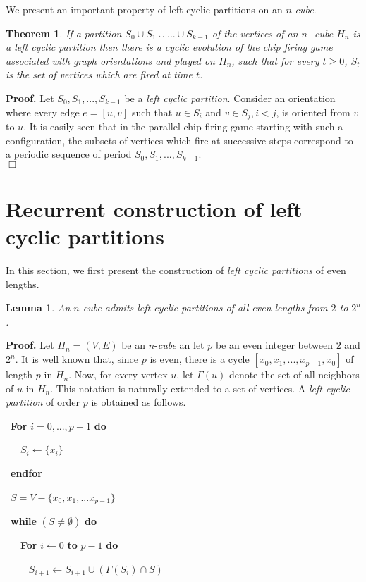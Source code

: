 \documentclass{article}
\newtheorem{theorem}{Theorem}
\newtheorem{lemma}{Lemma}
\begin{document}
We present an important property of left cyclic partitions on an $n$-{\em cube}.

\begin{theorem}
If a partition $S_0\cup S_1\cup ...\cup S_{k-1}$ of the vertices of an $n$-
  cube $H_n$ is a left cyclic partition then there is a
  cyclic evolution of the chip firing game associated with graph orientations
  and played on $H_n$, such that for every $t\geq 0$, $S_t$ is the set of
  vertices which are fired at time $t$.
\end{theorem}
{\bf Proof.} Let $S_0,S_1,...,S_{k-1}$ be a {\em left cyclic partition}. Consider
an orientation where every edge $e=[u,v]$ such that $u\in S_i$ and $v\in
S_j,i<j$, is oriented from $v$ to $u$. It is easily seen that in the parallel chip
firing game starting with such a configuration, the subsets of vertices
which fire at successive steps correspond to a periodic sequence of period
$S_0,S_1,...,S_{k-1}$.\\
$\Box$

\section{Recurrent construction of left cyclic partitions}
In this section, we first present the construction of {\em left cyclic
  partitions} of even lengths.
\begin{lemma}   \label{lem:allpair}
An $n$-cube admits left cyclic partitions of all even lengths from
$2$ to $2^n$.
\end{lemma}
{\bf Proof.} Let $H_n=(V,E)$ be an $n$-{\em cube} an let $p$ be an even
integer between $2$ and $2^n$. It is well known that, since $p$ is even,
there is a cycle $[x_0,x_1, ...,x_{p-1}, x_0]$
of length $p$ in $H_n$. Now, for every vertex $u$, let $\Gamma (u)$ denote the
set of all neighbors of $u$ in $H_n$. This notation is naturally extended to a
set of vertices. A {\em left cyclic partition} of order $p$ is
obtained  as follows.

\ {\bf For}  $i=0,...,p-1$ {\bf do}

\ \ \ $S_i\leftarrow \{ x_i\}$

\ {\bf endfor}

\ $S=V-\{ x_0,x_1,...x_{p-1} \}$

\ {\bf while} $(S\neq \emptyset)$ {\bf do}

\ \ \ {\bf For } $i\leftarrow 0$ {\bf to } $p-1$  {\bf do}

\ \ \ \ \hspace{2mm} $S_{i+1}\leftarrow S_{i+1}\cup (\Gamma (S_i)\cap S)$
\end{document}
